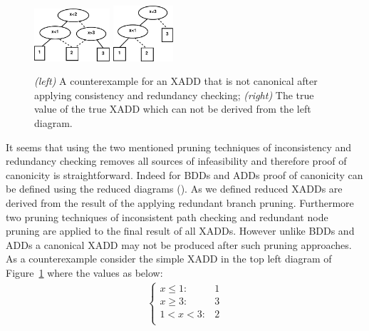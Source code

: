 \documentclass[twoside,11pt]{article}
\begin{document}
\begin{figure}[t!]
\centering
\includegraphics[width=0.25\textwidth]{pics/counterexample1.pdf} 
\hspace{20mm}
\includegraphics[width=0.20\textwidth]{pics/counterexample2.pdf} 
\caption{%
{\it (left)} A counterexample for an XADD that is not canonical after applying consistency and redundancy checking; {\it (right)}  The true value of the true XADD which can not be derived from the left diagram.} %
\label{fig:canonical}
\end{figure}
It seems that using the two mentioned pruning techniques of inconsistency and redundancy checking removes all sources of infeasibility and therefore proof of canonicity is straightforward. Indeed for BDDs and ADDs proof of canonicity can be defined using the reduced diagrams (\cite{bryant}). 
As we defined reduced XADDs are derived from the result of the applying redundant branch pruning. Furthermore two pruning techniques of inconsistent path checking and redundant node pruning are applied to the final result of all XADDs. However unlike BDDs and ADDs a canonical XADD may not be produced after such pruning approaches. As a counterexample consider the simple XADD in the top left diagram of Figure~\ref{fig:canonical} where the values as below: 
\begin{align*}
	\begin{cases}
		x \leq 1 :& 1  \\
		x \geq 3 :&3\\
		1<x<3 :& 2\\
	\end{cases}
\end{align*}
\end{document}
